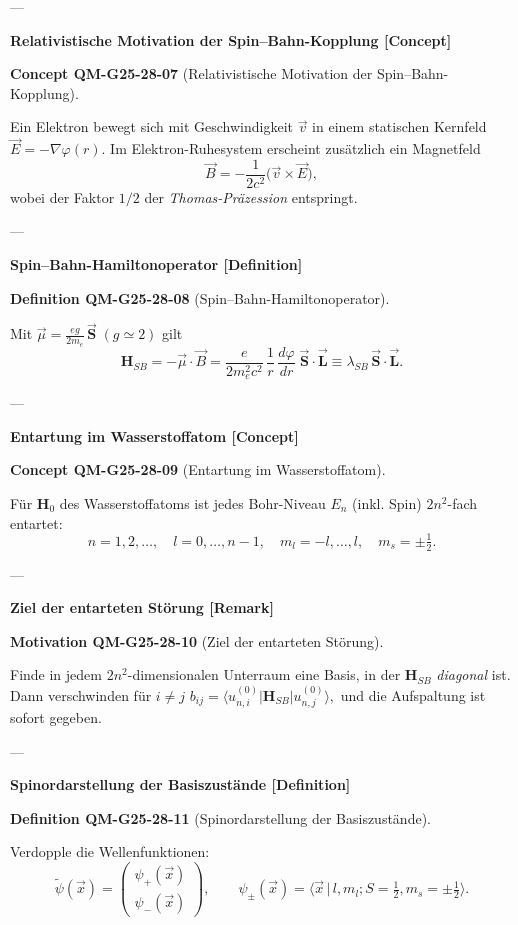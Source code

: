\documentclass[10pt, letterpaper]{article}
\newcommand{\CustomHeading}[3]{%
  \par\medskip\noindent%
  \textbf{#1 #2} \textnormal{(#3)}.\enskip%
}
\newenvironment{DEF}[2]{\begin{unitbox}\CustomHeading{Definition}{#1}{#2}}{\end{unitbox}}
\newenvironment{CONC}[2]{\begin{unitbox}\CustomHeading{Concept}{#1}{#2}}{\end{unitbox}}
\newenvironment{MOT}[2]{\begin{unitbox}\CustomHeading{Motivation}{#1}{#2}}{\end{unitbox}}
\begin{document}
---

\textbf{Relativistische Motivation der Spin–Bahn-Kopplung [Concept]}

\begin{CONC}{QM-G25-28-07}{Relativistische Motivation der Spin–Bahn-Kopplung}
Ein Elektron bewegt sich mit Geschwindigkeit $\vec v$ in einem statischen Kernfeld $\vec E=-\nabla\varphi(r)$.  
Im Elektron-Ruhesystem erscheint zusätzlich ein Magnetfeld
\[
\vec B = -\frac{1}{2c^{2}}\bigl(\vec v \times \vec E\bigr),
\]
wobei der Faktor $1/2$ der \emph{Thomas-Präzession} entspringt.
\end{CONC}

---

\textbf{Spin–Bahn-Hamiltonoperator [Definition]}

\begin{DEF}{QM-G25-28-08}{Spin–Bahn-Hamiltonoperator}
Mit $\vec\mu=\tfrac{eg}{2m_e}\,\vec{\mathbf S}\;(g\!\simeq\!2)$ gilt
\[
\mathbf{H}_{SB} = -\vec\mu\!\cdot\!\vec B
   = \frac{e}{2m_e^{2}c^{2}}\,
     \frac{1}{r}\,\frac{d\varphi}{dr}\;
     \vec{\mathbf S}\!\cdot\!\vec{\mathbf L}
   \equiv \lambda_{SB}\,\vec{\mathbf S}\!\cdot\!\vec{\mathbf L}.
\]
\end{DEF}

---

\textbf{Entartung im Wasserstoffatom [Concept]}

\begin{CONC}{QM-G25-28-09}{Entartung im Wasserstoffatom}
Für $\mathbf{H}_0$ des Wasserstoffatoms ist jedes Bohr-Niveau $E_n$ (inkl. Spin) $2n^{2}$-fach entartet:
\[
n=1,2,\dots,\quad
l = 0,\dots,n-1,\quad
m_l = -l,\dots,l,\quad
m_s = \pm \tfrac12.
\]
\end{CONC}

---

\textbf{Ziel der entarteten Störung [Remark]}

\begin{MOT}{QM-G25-28-10}{Ziel der entarteten Störung}
Finde in jedem $2n^{2}$-dimensionalen Unterraum eine Basis, in der
\(
\mathbf{H}_{SB}
\)
\emph{diagonal} ist.  
Dann verschwinden für $i\neq j$
\(
b_{ij}=\langle u_{n,i}^{(0)}|\mathbf{H}_{SB}|u_{n,j}^{(0)}\rangle,
\)
und die Aufspaltung ist sofort gegeben.
\end{MOT}

---

\textbf{Spinordarstellung der Basiszustände [Definition]}

\begin{DEF}{QM-G25-28-11}{Spinordarstellung der Basiszustände}
Verdopple die Wellenfunktionen:
\[
\tilde\psi(\vec x)=
\begin{pmatrix}\psi_{+}(\vec x)\\ \psi_{-}(\vec x)\end{pmatrix},
\qquad
\psi_{\pm}(\vec x)=\langle\vec x\,|\,l,m_l;S=\tfrac12,m_s=\pm\tfrac12\rangle.
\]
\end{DEF}
\end{document}
